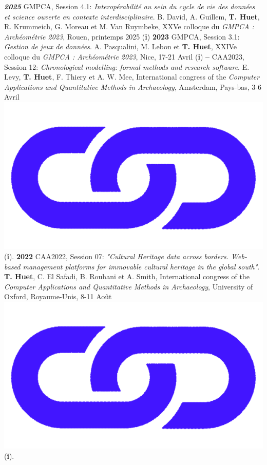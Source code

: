 \documentclass{article}
\begin{document}
\textbf{\textit{2025} }GMPCA, Session 4.1: \textit{Interopérabilité au sein du cycle de vie des données et science ouverte en contexte interdisciplinaire}. B. David, A. Guillem, \textbf{T. Huet}, R. Krummeich, G. Moreau et M. Van Ruymbeke, XXVe colloque du \textit{GMPCA : Archéométrie 2023}, Rouen, printemps 2025 (\textbf{i})
\smallbreak
\textbf{2023 }GMPCA, Session 3.1: \textit{Gestion de jeux de données}. A. Pasqualini, M. Lebon et \textbf{T. Huet}, XXIVe colloque du \textit{GMPCA : Archéométrie 2023}, Nice, 17-21 Avril (\textbf{i})
\smallbreak
\textbf{-- }CAA2023, Session 12: \textit{Chronological modelling: formal methods and research software}. E. Levy, \textbf{T. Huet}, F. Thiery et A. W. Mee, International congress of the \textit{Computer Applications and Quantitative Methods in Archaeology}, Amsterdam, Pays-bas, 3-6 Avril \href{https://historical-time.github.io/caa23/s12/pres/#/title-slide}{\includegraphics[scale=0.02]{link_darkblue.png}} (\textbf{i}).
\smallbreak
\textbf{2022 }CAA2022, Session 07: \textit{"Cultural Heritage data across borders. Web-based management platforms for immovable cultural heritage in the global south"}. \textbf{T. Huet}, C. El Safadi, B. Rouhani et A. Smith, International congress of the \textit{Computer Applications and Quantitative Methods in Archaeology}, University of Oxford, Royaume-Unis, 8-11 Août \href{https://eamena-project.github.io/reveal.js/projects/caa22s07.html}{\includegraphics[scale=0.02]{link_darkblue.png}} (\textbf{i}). 
\end{document}
